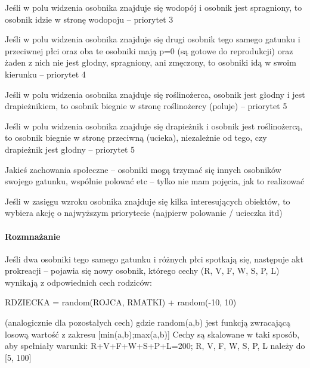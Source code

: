 \begin{DoxyItemize}
\item Jeśli w polu widzenia osobnika znajduje się wodopój i osobnik jest spragniony, to osobnik idzie w stronę wodopoju – priorytet 3
\end{DoxyItemize}


\begin{DoxyItemize}
\item Jeśli w polu widzenia osobnika znajduje się drugi osobnik tego samego gatunku i przeciwnej płci oraz oba te osobniki mają p=0 (są gotowe do reprodukcji) oraz żaden z nich nie jest głodny, spragniony, ani zmęczony, to osobniki idą w swoim kierunku – priorytet 4
\end{DoxyItemize}


\begin{DoxyItemize}
\item Jeśli w polu widzenia osobnika znajduje się roślinożerca, osobnik jest głodny i jest drapieżnikiem, to osobnik biegnie w stronę roślinożercy (poluje) – priorytet 5
\end{DoxyItemize}


\begin{DoxyItemize}
\item Jeśli w polu widzenia osobnika znajduje się drapieżnik i osobnik jest roślinożercą, to osobnik biegnie w stronę przeciwną (ucieka), niezależnie od tego, czy drapieżnik jest głodny – priorytet 5
\end{DoxyItemize}

Jakieś zachowania społeczne – osobniki mogą trzymać się innych osobników swojego gatunku, wspólnie polować etc – tylko nie mam pojęcia, jak to realizować

Jeśli w zasięgu wzroku osobnika znajduje się kilka interesujących obiektów, to wybiera akcję o najwyższym priorytecie (najpierw polowanie / ucieczka itd)

\paragraph*{Rozmnażanie}

Jeśli dwa osobniki tego samego gatunku i różnych płci spotkają się, następuje akt prokreacji – pojawia się nowy osobnik, którego cechy (R, V, F, W, S, P, L) wynikają z odpowiednich cech rodziców\-:

{\ttfamily R\-D\-Z\-I\-E\-C\-K\-A = random(\-R\-O\-J\-C\-A, R\-M\-A\-T\-K\-I) + random(-\/10, 10)}

(analogicznie dla pozostałych cech) gdzie {\ttfamily random(a,b)} jest funkcją zwracającą losową wartość z zakresu {\ttfamily \mbox{[}min(a,b);max(a,b)\mbox{]}} Cechy są skalowane w taki sposób, aby spełniały warunki\-: {\ttfamily R+\-V+\-F+\-W+\-S+\-P+\-L=200; R, V, F, W, S, P, L należy do \mbox{[}5, 100\mbox{]}}

